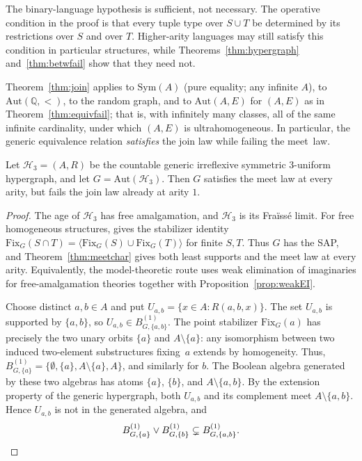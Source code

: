 \documentclass{lmcs}
\newcommand{\Sym}{\mathrm{Sym}}
\newcommand{\Fix}{\mathrm{Fix}}
\newcommand{\Aut}{\mathrm{Aut}}
\begin{document}
The binary-language hypothesis is sufficient, not necessary. The operative
condition in the proof is that every tuple type over $S\cup T$ be determined
by its restrictions over $S$ and over $T$. Higher-arity languages may still
satisfy this condition in particular structures, while
Theorems~\ref{thm:hypergraph} and~\ref{thm:betwfail} show that they need
not.

\begin{exa}
Theorem~\ref{thm:join} applies to $\Sym(A)$ (pure equality; any
infinite $A$), to \mbox{$\Aut(\mathbb Q,<)$}, to the random graph, and to
$\Aut(A,E)$ for $(A,E)$ as in Theorem~\ref{thm:equivfail}; that is,
with infinitely many classes, all of the same infinite cardinality,
under which $(A,E)$ is ultrahomogeneous. In particular, the generic
equivalence relation \emph{satisfies} the join law while failing the
meet~law.
\end{exa}

\begin{thm}
\label{thm:hypergraph}
Let $\mathcal H_3=(A,R)$ be the countable generic irreflexive symmetric
$3$-uniform hypergraph, and let $G=\Aut(\mathcal H_3)$. Then $G$
satisfies the meet law at every arity, but fails the join law already
at arity $1$.
\end{thm}

\begin{proof}
The age of $\mathcal H_3$ has free amalgamation, and $\mathcal H_3$ is
its Fra\"iss\'e limit. For free homogeneous structures,
\cite[Lem.~2.7(i)]{MacphersonTent11} gives the stabilizer identity
$\Fix_G(S\cap T)=\langle\Fix_G(S)\cup\Fix_G(T)\rangle$ for finite
$S,T$. Thus $G$ has the SAP, and Theorem~\ref{thm:meetchar} gives both
least supports and the meet law at every arity. Equivalently, the
model-theoretic route uses weak elimination of imaginaries for
free-amalgamation theories \cite[Thm.~4.7]{Conant17} together with
Proposition~\ref{prop:weakEI}.

Choose distinct $a,b\in A$ and put $U_{a,b}=\{x\in A:R(a,b,x)\}$.
The set $U_{a,b}$ is supported by $\{a,b\}$, so
$U_{a,b}\in B^{(1)}_{G,\{a,b\}}$. The point stabilizer $\Fix_G(a)$
has precisely the two unary orbits $\{a\}$ and $A\setminus\{a\}$:
any isomorphism between two induced two-element substructures fixing~$a$ extends by homogeneity. Thus, $B^{(1)}_{G,\{a\}}=\{\emptyset,\{a\},A\setminus\{a\},A\}$, and similarly for $b$. The Boolean algebra generated by these two
algebras has atoms $\{a\}$, $\{b\}$, and $A\setminus\{a,b\}$. By the
extension property of the generic hypergraph, both $U_{a,b}$ and its
complement meet $A\setminus\{a,b\}$. Hence $U_{a,b}$ is not in the
generated algebra, and
\[
 B^{(1)}_{G,\{a\}}\vee B^{(1)}_{G,\{b\}}
 \subsetneq B^{(1)}_{G,\{a,b\}}. \qedhere
\]
\end{proof}
\end{document}

